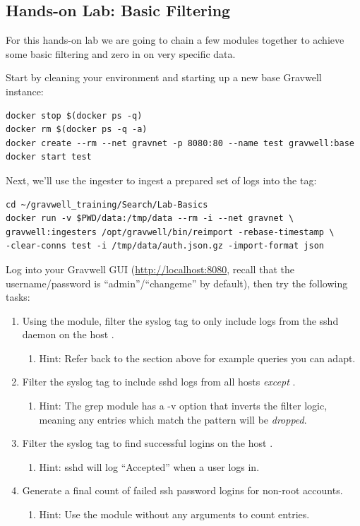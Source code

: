 \clearpage
\subsection{Hands-on Lab: Basic Filtering}
\label{sec:lab-filter}

For this hands-on lab we are going to chain a few modules together to
achieve some basic filtering and zero in on very specific data.

Start by cleaning your environment and starting up a new base Gravwell
instance:

\begin{Verbatim}[breaklines=true]
docker stop $(docker ps -q)
docker rm $(docker ps -q -a)
docker create --rm --net gravnet -p 8080:80 --name test gravwell:base
docker start test
\end{Verbatim}

Next, we'll use the  ingester to ingest a prepared set of logs into the  tag:

\begin{Verbatim}[breaklines=true]
cd ~/gravwell_training/Search/Lab-Basics
docker run -v $PWD/data:/tmp/data --rm -i --net gravnet \
gravwell:ingesters /opt/gravwell/bin/reimport -rebase-timestamp \
-clear-conns test -i /tmp/data/auth.json.gz -import-format json
\end{Verbatim}

Log into your Gravwell GUI (\href{http://localhost:8080}{http://localhost:8080}, recall that the username/password is ``admin''/``changeme'' by default), then try the following tasks:

\begin{enumerate}
\item
  Using the  module, filter the syslog tag to only include logs from the sshd daemon on the
  host .
	\begin{enumerate}
	\item
	  Hint: Refer back to the section above for example queries you can adapt.
	\end{enumerate}
\item
  Filter the syslog tag to include sshd logs from all hosts \emph{except} .
	\begin{enumerate}
	\item
	  Hint: The grep module has a -v option that inverts the filter logic, meaning any entries which match the pattern will be \emph{dropped}.
	\end{enumerate}
\item
  Filter the syslog tag to find successful logins on the host .
	\begin{enumerate}
	\item
	  Hint: sshd will log ``Accepted'' when a user logs in.
	\end{enumerate}
\item
  Generate a final count of failed ssh password logins for non-root
  accounts.
	\begin{enumerate}
	\item
	  Hint: Use the  module without any arguments to count entries.
	\end{enumerate}
\end{enumerate}

